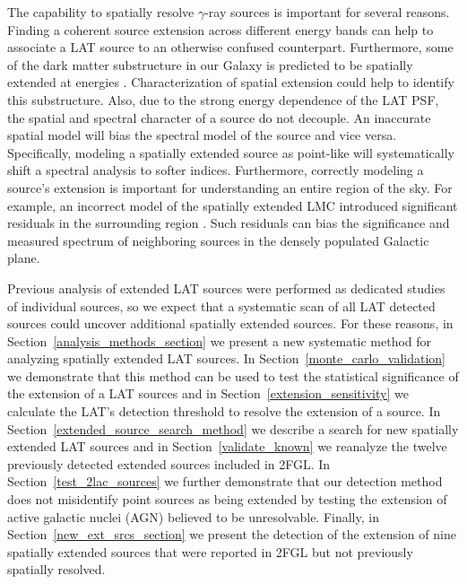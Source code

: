 \documentclass[12pt,preprint]{aastex}
\newcommand{\gev}{\text{GeV}\xspace}
\begin{document}
{The capability to spatially resolve \gev $\gamma$-ray
sources is important for several reasons.  
Finding a coherent source extension across different energy bands can
help to associate a LAT source to an otherwise confused counterpart.
Furthermore, some of the dark matter substructure in our Galaxy 
is predicted to be spatially extended at \gev energies \citep{pre_luanch_dark_matter_fermi}.  
Characterization of spatial extension could help to identify this substructure.
Also,
due to the strong energy dependence of the LAT PSF, the spatial and
spectral character of a source do not decouple. An inaccurate
spatial model will bias the spectral model of the source and vice versa. Specifically,
modeling a spatially extended source as point-like will systematically
shift a spectral analysis to softer indices. Furthermore, correctly
modeling a source's extension is important for 
understanding an entire region of the sky. For example,
an incorrect model of the spatially extended LMC introduced
significant residuals in the surrounding region \citep{first_cat,second_cat}.
Such residuals can bias the significance and measured spectrum of
neighboring sources in the densely populated Galactic plane.


Previous analysis of
extended LAT sources were performed as dedicated studies
of individual sources, so we expect
that a systematic scan of all LAT detected sources
could uncover additional spatially extended sources.  For these
reasons, in Section~\ref{analysis_methods_section} we present
a new systematic method for analyzing spatially extended LAT sources. In
Section~\ref{monte_carlo_validation} we demonstrate that this method
can be used to test the statistical significance of
the extension of
a LAT sources and in Section~\ref{extension_sensitivity} we calculate
the LAT's detection threshold to resolve the extension of a source.
In Section~\ref{extended_source_search_method} we describe a search for
new spatially extended LAT sources and in Section~\ref{validate_known}
we reanalyze the twelve previously detected extended sources
included in 2FGL.  In Section~\ref{test_2lac_sources} we further
demonstrate that our detection method does not misidentify
point sources as being extended 
by testing the extension of active
galactic nuclei (AGN) believed to be unresolvable. Finally, in
Section~\ref{new_ext_srcs_section} we present the detection of the
extension of nine spatially extended sources that were reported in 2FGL
but not previously spatially resolved.

}
\end{document}
